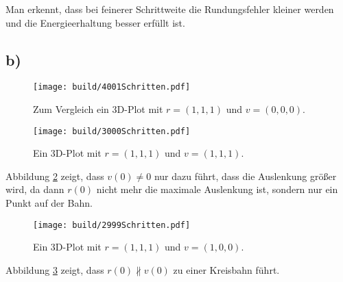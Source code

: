 Man erkennt, dass bei feinerer Schrittweite die Rundungsfehler kleiner werden und die Energieerhaltung besser erfüllt ist.
\subsection*{b)}

\begin{figure}
  \centering
  \texttt{[image: build/4001Schritten.pdf]}
  \caption{Zum Vergleich ein 3D-Plot mit $r=(1, 1, 1)$ und $v=(0, 0, 0)$.}
  \label{}
\end{figure}
\begin{figure}
  \centering
  \texttt{[image: build/3000Schritten.pdf]}
  \caption{Ein 3D-Plot mit $r=(1, 1, 1)$ und $v=(1, 1, 1)$.}
  \label{fig:4001Schritten}
\end{figure}
Abbildung \ref{fig:4001Schritten} zeigt, dass $v(0) \neq 0$ nur dazu führt, dass die Auslenkung größer wird, da dann $r(0)$ nicht mehr die maximale Auslenkung ist, sondern nur ein Punkt auf der Bahn.
\begin{figure}
  \centering
  \texttt{[image: build/2999Schritten.pdf]}
  \caption{Ein 3D-Plot mit $r=(1, 1, 1)$ und $v=(1, 0, 0)$.}
  \label{fig:2999Schritten}
\end{figure}
Abbildung \ref{fig:2999Schritten} zeigt, dass $r(0) \nparallel v(0)$ zu einer Kreisbahn führt.



